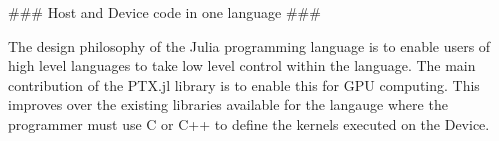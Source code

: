 \begin{markdown}
### Host and Device code in one language ###

The design philosophy of the Julia programming language is to enable
users of high level languages to take low level control within the
language. The main contribution of the PTX.jl library is to enable
this for GPU computing. This improves over the existing libraries
available for the langauge where the programmer must use C or C++ to
define the kernels executed on the Device.

\end{markdown}
